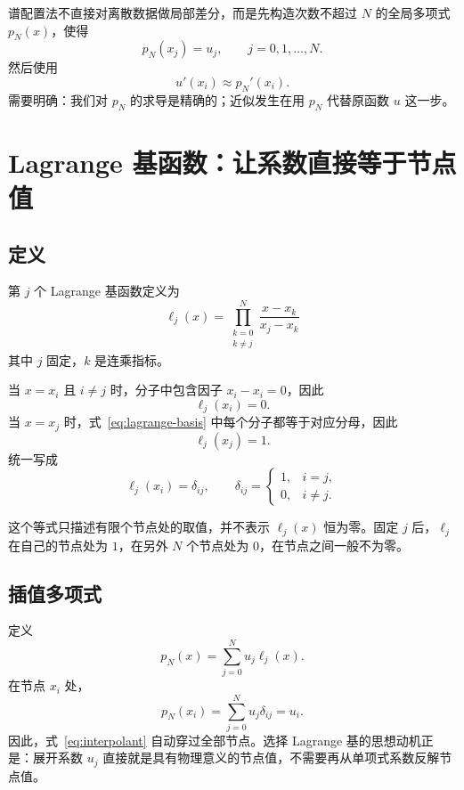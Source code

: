 \documentclass[11pt,a4paper]{ctexart}
\numberwithin{equation}{section}
\begin{document}
谱配置法不直接对离散数据做局部差分，而是先构造次数不超过 $N$ 的全局多项式 $p_N(x)$，使得
\begin{equation}
  p_N(x_j)=u_j,\qquad j=0,1,\ldots,N.
\end{equation}
然后使用
\begin{equation}
  u'(x_i)\approx p_N'(x_i).
\end{equation}
需要明确：我们对 $p_N$ 的求导是精确的；近似发生在用 $p_N$ 代替原函数 $u$ 这一步。

\section{Lagrange 基函数：让系数直接等于节点值}

\subsection{定义}

第 $j$ 个 Lagrange 基函数定义为
\begin{equation}
  \boxed{
  \ell_j(x)=
  \prod_{\substack{k=0\\k\ne j}}^N
  \frac{x-x_k}{x_j-x_k}}
  \label{eq:lagrange-basis}
\end{equation}
其中 $j$ 固定，$k$ 是连乘指标。

当 $x=x_i$ 且 $i\ne j$ 时，分子中包含因子 $x_i-x_i=0$，因此
\begin{equation}
  \ell_j(x_i)=0.
\end{equation}
当 $x=x_j$ 时，式~\eqref{eq:lagrange-basis} 中每个分子都等于对应分母，因此
\begin{equation}
  \ell_j(x_j)=1.
\end{equation}
统一写成
\begin{equation}
  \boxed{\ell_j(x_i)=\delta_{ij}},
  \qquad
  \delta_{ij}=\begin{cases}1,&i=j,\\0,&i\ne j.\end{cases}
\end{equation}

这个等式只描述有限个节点处的取值，并不表示 $\ell_j(x)$ 恒为零。固定 $j$ 后，$\ell_j$ 在自己的节点处为 $1$，在另外 $N$ 个节点处为 $0$，在节点之间一般不为零。

\subsection{插值多项式}

定义
\begin{equation}
  \boxed{p_N(x)=\sum_{j=0}^N u_j\ell_j(x)}.
  \label{eq:interpolant}
\end{equation}
在节点 $x_i$ 处，
\begin{equation}
  p_N(x_i)=\sum_{j=0}^N u_j\delta_{ij}=u_i.
\end{equation}
因此，式~\eqref{eq:interpolant} 自动穿过全部节点。选择 Lagrange 基的思想动机正是：展开系数 $u_j$ 直接就是具有物理意义的节点值，不需要再从单项式系数反解节点值。
\end{document}
